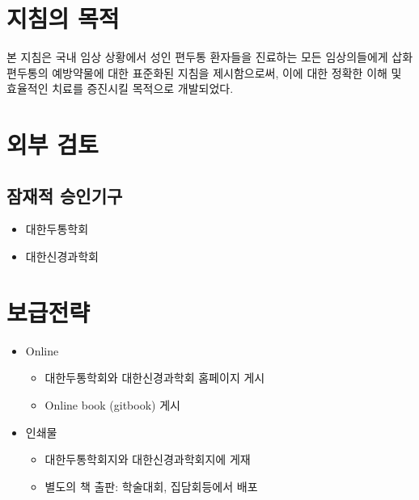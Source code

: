 \documentclass[]{book}
\providecommand{\tightlist}{%
  \setlength{\itemsep}{0pt}\setlength{\parskip}{0pt}}
\begin{document}
\hypertarget{section-41}{%
\section{지침의 목적}\label{section-41}}

본 지침은 국내 임상 상황에서 성인 편두통 환자들을 진료하는 모든 임상의들에게 삽화편두통의 예방약물에 대한 표준화된 지침을 제시함으로써, 이에 대한 정확한 이해 및 효율적인 치료를 증진시킬 목적으로 개발되었다.

\hypertarget{section-42}{%
\section{외부 검토}\label{section-42}}

\hypertarget{section-43}{%
\subsection*{잠재적 승인기구}\label{section-43}}

\begin{itemize}
\tightlist
\item
  대한두통학회
\item
  대한신경과학회
\end{itemize}

\hypertarget{section-44}{%
\section{보급전략}\label{section-44}}

\begin{itemize}
\tightlist
\item
  Online

  \begin{itemize}
  \tightlist
  \item
    대한두통학회와 대한신경과학회 홈페이지 게시
  \item
    Online book (gitbook) 게시
  \end{itemize}
\item
  인쇄물

  \begin{itemize}
  \tightlist
  \item
    대한두통학회지와 대한신경과학회지에 게재
  \item
    별도의 책 출판: 학술대회, 집담회등에서 배포
  \end{itemize}
\end{itemize}
\end{document}
